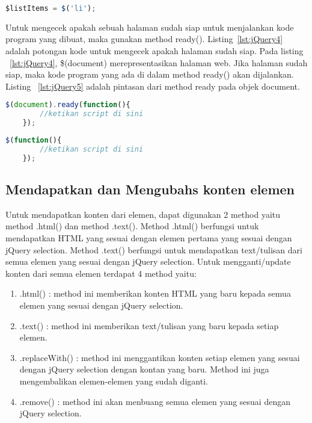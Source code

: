 \begin{lstlisting}[language=Javascript, caption=Menyimpan objek jQuery , label={lst:jQuery3}]
	$listItems = $('li');
\end{lstlisting}

Untuk mengecek apakah sebuah halaman sudah siap untuk menjalankan kode program yang dibuat, maka gunakan method ready(). Listing~\ref{lst:jQuery4} adalah potongan kode untuk mengecek apakah halaman sudah siap. Pada listing ~\ref{lst:jQuery4}, \$(document) merepresentasikan halaman web. Jika halaman sudah siap, maka kode program yang ada di dalam method ready() akan dijalankan. Listing ~\ref{lst:jQuery5} adalah pintasan dari method ready pada objek document.

\begin{lstlisting}[language=Javascript, caption=Mengecek apakah halaman sudah siap , label={lst:jQuery4}]
	$(document).ready(function(){
		//ketikan script di sini
	});
\end{lstlisting}

\begin{lstlisting}[language=Javascript, caption=Pintasan dari method \$(document).ready() , label={lst:jQuery5}]
	$(function(){
		//ketikan script di sini
	});
\end{lstlisting}

\subsection{Mendapatkan dan Mengubahs konten elemen}
Untuk mendapatkan konten dari elemen, dapat digunakan 2 method yaitu method .html() dan method .text(). Method .html() berfungsi untuk mendapatkan HTML yang sesuai dengan elemen pertama yang sesuai dengan jQuery selection. Method .text() berfungsi untuk mendapatkan text/tulisan dari semua elemen yang sesuai dengan jQuery selection. Untuk mengganti/update konten dari semua elemen terdapat 4 method yaitu:

\begin{enumerate}
	\item .html() : method ini memberikan konten HTML yang baru kepada semua elemen yang sesuai dengan jQuery selection.
	\item .text() : method ini memberikan text/tulisan yang baru kepada setiap elemen.
	\item .replaceWith() : method ini menggantikan konten setiap elemen yang sesuai dengan jQuery selection dengan kontan yang baru. Method ini juga mengembalikan elemen-elemen yang sudah diganti.
	\item .remove() : method ini akan menbuang semua elemen yang sesuai dengan jQuery selection.
\end{enumerate}


